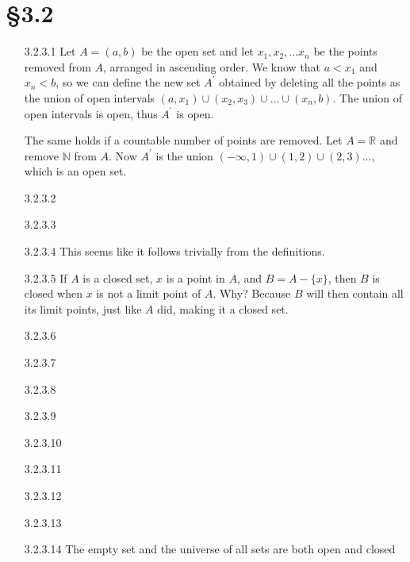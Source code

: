 \documentclass{article}
\begin{document}
\section*{\S 3.2}
\begin{enumerate}
\item[3.2.3.1]
  Let $A=(a, b)$ be the open set and let 
  $x_1, x_2, \ldots x_n$ be the points removed from $A$,
  arranged in ascending order. We know that $a<x_1$ and 
  $x_n < b$, so we can define the new set $A^\prime$ obtained
  by deleting all the points as the union of open intervals
  $(a, x_1) \cup (x_2, x_3) \cup \ldots \cup (x_n, b)$. 
  The union of open intervals is open, thus $A^\prime$ is open.

  The same holds if a countable number of points are removed. 
  Let $A=\mathbb{R}$ and remove $\mathbb{N}$ from $A$. 
  Now $A^\prime$ is the union $(-\infty, 1) \cup (1, 2) \cup (2, 3) \ldots$, 
  which is an open set. 
\item[]
\item[3.2.3.2]
\item[]
\item[3.2.3.3]
\item[]
\item[3.2.3.4]
  This seems like it follows trivially from the definitions. 
\item[]
\item[3.2.3.5]
  If $A$ is a closed set, $x$ is a point in $A$, and $B = A - \{ x \}$, 
  then $B$ is closed when $x$ is not a limit point of $A$. Why?
  Because $B$ will then contain all its limit points, just like $A$
  did, making it a closed set. 
\item[]
\item[3.2.3.6]
\item[]
\item[3.2.3.7]
\item[]
\item[3.2.3.8]
\item[]
\item[3.2.3.9]
\item[]
\item[3.2.3.10]
\item[]
\item[3.2.3.11]
\item[]
\item[3.2.3.12]
\item[]
\item[3.2.3.13]
\item[]
\item[3.2.3.14]
  The empty set and the universe of all sets are both open and closed 

\end{enumerate}
\end{document}
